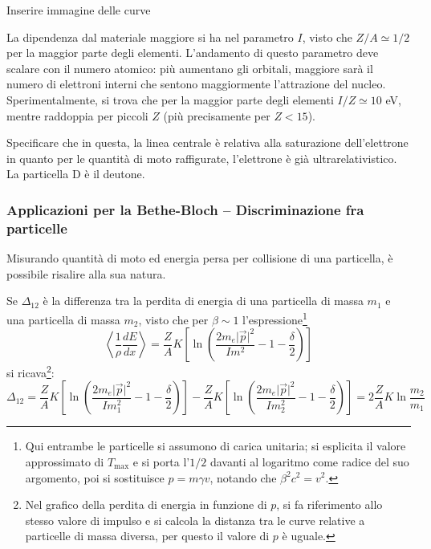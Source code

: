 \documentclass[10pt, a4paper]{scrartcl}
\numberwithin{equation}{subsection}
\theoremstyle{style1}
\newenvironment{boxenv}[1][]{
    \begin{eqbox}[#1]
    }{
   \end{eqbox}
}
\begin{document}
\begin{boxenv}[]
\centering	\color{red}Inserire immagine delle curve 
\end{boxenv}
\noindent La dipendenza dal materiale maggiore si ha nel parametro $I$, visto che $Z / A \simeq 1 /2 $ per la maggior parte degli elementi. L'andamento di questo parametro deve scalare con il numero atomico: pi\`u aumentano gli orbitali, maggiore sar\`a il numero di elettroni interni che sentono maggiormente l'attrazione del nucleo. Sperimentalmente, si trova che per la maggior parte degli elementi $I / Z \simeq 10 $ eV, mentre raddoppia per piccoli $Z$ (pi\`u precisamente per $Z < 15$).
\begin{boxenv}[]

Specificare che in questa, la linea centrale \`e relativa alla saturazione dell'elettrone in quanto per le quantit\`a di moto raffigurate, l'elettrone \`e gi\`a ultrarelativistico. La particella D \`e il deutone.
\end{boxenv}
\subsubsection{Applicazioni per la Bethe-Bloch -- Discriminazione fra particelle}

Misurando quantit\`a di moto ed energia persa per collisione di una particella, \`e possibile risalire alla sua natura.

Se $\Delta _{12} $ \`e la differenza tra la perdita di energia di una particella di massa $m_1$ e una particella di massa $m_2$, visto che per $\beta \sim 1$ l'espressione\footnote{Qui entrambe le particelle si assumono di carica unitaria; si esplicita il valore approssimato di $T_\text{max}$ e si porta l'$1 / 2 $ davanti al logaritmo come radice del suo argomento, poi si sostituisce $p = m \gamma v$, notando che $\beta ^2 c^2 = v^2$.}
\[
\left\langle \frac{1}{\rho } \frac{d E}{d x}  \right\rangle =  \frac{Z}{A} K \left[ \ln \left(\frac{2m _e \lvert \vec{p} \rvert ^2}{I m^2} - 1 - \frac{\delta }{2}\right)  \right] 
\] 
si ricava\footnote{Nel grafico della perdita di energia in funzione di $p$, si fa riferimento allo stesso valore di impulso e si calcola la distanza tra le curve relative a particelle di massa diversa, per questo il valore di $p$ \`e uguale.}:
\begin{equation}
	\Delta _{12}  =  \frac{Z}{A} K \left[ \ln \left(\frac{2m _e \lvert \vec{p} \rvert ^2}{I m_1^2} - 1 - \frac{\delta }{2}\right)  \right] -  \frac{Z}{A} K \left[ \ln \left(\frac{2m _e \lvert \vec{p} \rvert ^2}{I m_2^2} - 1 - \frac{\delta }{2}\right)  \right] = 2 \frac{Z}{A } K \ln \frac{m_2}{m_1}
\end{equation}
\end{document}
